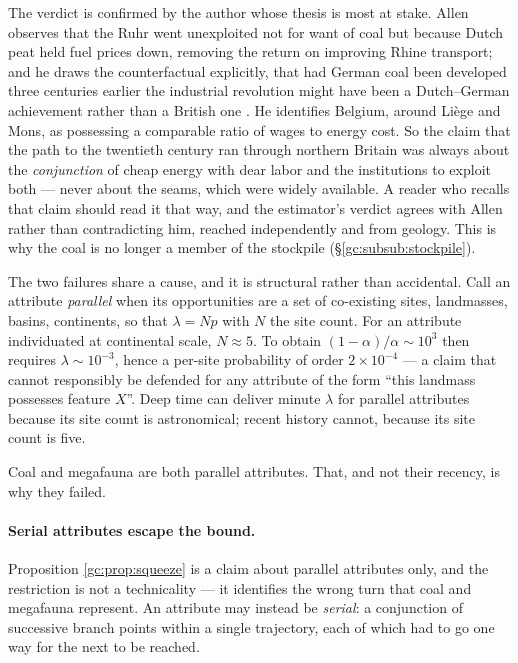 The verdict is confirmed by the author whose thesis is most at stake.
Allen observes that the Ruhr went unexploited not for want of coal but
because Dutch peat held fuel prices down, removing the return on
improving Rhine transport; and he draws the counterfactual explicitly,
that had German coal been developed three centuries earlier the
industrial revolution might have been a Dutch--German achievement rather
than a British one \cite{Allen09}. He identifies Belgium, around
Li\`ege and Mons, as possessing a comparable ratio of wages to energy
cost. So the claim that the path to the twentieth century ran through
northern Britain was always about the \emph{conjunction} of cheap energy
with dear labor and the institutions to exploit both --- never about
the seams, which were widely available. A reader who recalls that claim
should read it that way, and the estimator's verdict agrees with Allen
rather than contradicting him, reached independently and from geology.
This is why the coal is no longer a member of the stockpile
(\S\ref{gc:subsub:stockpile}).


\begin{proposition}\label{gc:prop:squeeze}
The two failures share a cause, and it is structural rather than
accidental. Call an attribute \emph{parallel} when its opportunities are
a set of co-existing sites, landmasses, basins, continents, so
that $\lambda=Np$ with $N$ the site count. For an attribute individuated
at continental scale, $N\approx5$. To obtain
$(1-\alpha)/\alpha\sim10^{3}$ then requires $\lambda\sim10^{-3}$, hence
a per-site probability of order $2\times10^{-4}$ --- a claim that cannot
responsibly be defended for any attribute of the form ``this landmass
possesses feature $X$''. Deep time can deliver minute $\lambda$ for
parallel attributes because its site count is astronomical; recent
history cannot, because its site count is five.

Coal and megafauna are both parallel attributes. That, and not their
recency, is why they failed.
\end{proposition}

\paragraph{Serial attributes escape the bound.} Proposition
\ref{gc:prop:squeeze} is a claim about parallel attributes only, and the
restriction is not a technicality --- it identifies the wrong turn that
coal and megafauna represent. An attribute may instead be
\emph{serial}: a conjunction of successive branch points within a single
trajectory, each of which had to go one way for the next to be reached.

